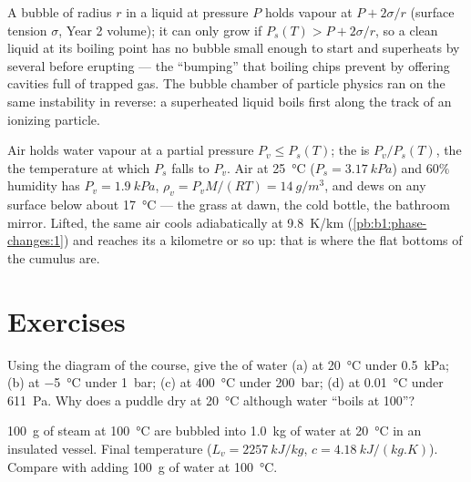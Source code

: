 \begin{remark}\label{rem:b1:phase-changes:nucleation}
A bubble of radius $r$ in a liquid at pressure $P$ holds vapour at
$P + 2\sigma/r$ (surface tension $\sigma$, Year 2 volume); it can only
grow if $P_s(T) > P + 2\sigma/r$, so a clean liquid at its boiling point
has no bubble small enough to start and superheats by several 
before erupting --- the ``bumping'' that boiling chips prevent by
offering cavities full of trapped gas. The bubble chamber of particle
physics ran on the same instability in reverse: a superheated liquid
boils first along the track of an ionizing particle.
\end{remark}

\begin{example}\label{ex:b1:phase-changes:dew}
Air holds water vapour at a partial pressure $P_v \leq P_s(T)$; the
\emph{} is $P_v/P_s(T)$, the \emph{} the
temperature at which $P_s$ falls to $P_v$. Air at \qty{25}{\degreeCelsius}
($P_s = \qty{3.17}{kPa}$) and $60\%$ humidity has $P_v = \qty{1.9}{kPa}$,
$\rho_v = P_vM/(RT) = \qty{14}{g/m^3}$, and dews on any surface below
about \qty{17}{\degreeCelsius} --- the grass at dawn, the cold bottle, the
bathroom mirror. Lifted, the same air cools adiabatically at
\qty{9.8}{K/km} (\cref{pb:b1:phase-changes:1}) and reaches its  a
kilometre or so up: that is where the flat bottoms of the cumulus are.
\end{example}

\section{Exercises}

\begin{exercise}[$\star$]\label{exo:b1:phase-changes:1}
Using the diagram of the course, give the  of water (a) at
\qty{20}{\degreeCelsius} under \qty{0.5}{kPa}; (b) at \qty{-5}{\degreeCelsius}
under \qty{1}{bar}; (c) at \qty{400}{\degreeCelsius} under \qty{200}{bar};
(d) at \qty{0.01}{\degreeCelsius} under \qty{611}{Pa}. Why does a puddle dry
at \qty{20}{\degreeCelsius} although water ``boils at 100''?
\end{exercise}

\begin{exercise}[$\star$]\label{exo:b1:phase-changes:2}
\qty{100}{g} of steam at \qty{100}{\degreeCelsius} are bubbled into
\qty{1.0}{kg} of water at \qty{20}{\degreeCelsius} in an insulated vessel.
Final temperature ($L_v = \qty{2257}{kJ/kg}$, $c = \qty{4.18}{kJ/(kg.K)}$).
Compare with adding \qty{100}{g} of water at \qty{100}{\degreeCelsius}.
\end{exercise}

